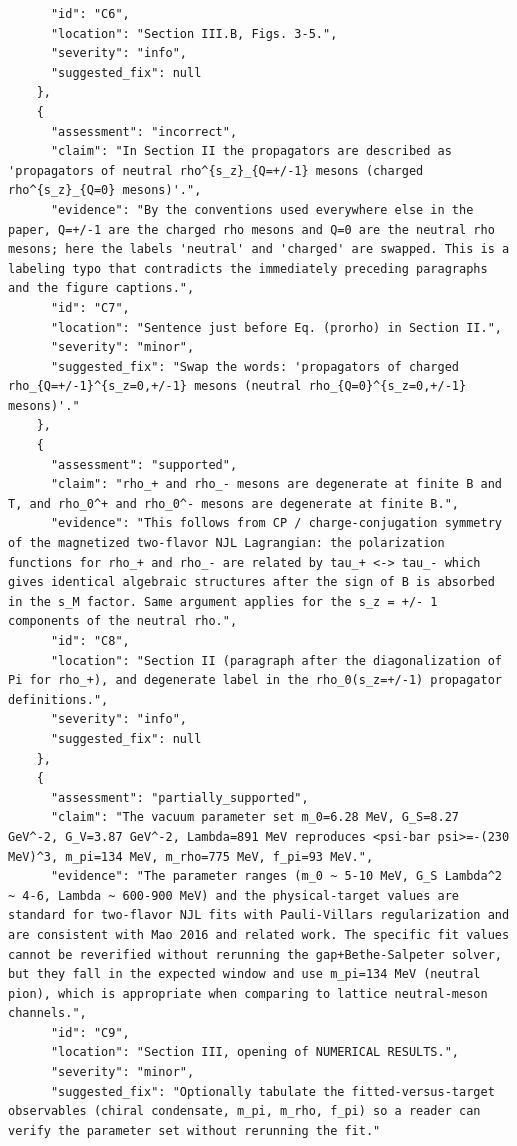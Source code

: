 \documentclass[11pt]{article}
\begin{document}
\begin{verbatim}
      "id": "C6",
      "location": "Section III.B, Figs. 3-5.",
      "severity": "info",
      "suggested_fix": null
    },
    {
      "assessment": "incorrect",
      "claim": "In Section II the propagators are described as 'propagators of neutral rho^{s_z}_{Q=+/-1} mesons (charged rho^{s_z}_{Q=0} mesons)'.",
      "evidence": "By the conventions used everywhere else in the paper, Q=+/-1 are the charged rho mesons and Q=0 are the neutral rho mesons; here the labels 'neutral' and 'charged' are swapped. This is a labeling typo that contradicts the immediately preceding paragraphs and the figure captions.",
      "id": "C7",
      "location": "Sentence just before Eq. (prorho) in Section II.",
      "severity": "minor",
      "suggested_fix": "Swap the words: 'propagators of charged rho_{Q=+/-1}^{s_z=0,+/-1} mesons (neutral rho_{Q=0}^{s_z=0,+/-1} mesons)'."
    },
    {
      "assessment": "supported",
      "claim": "rho_+ and rho_- mesons are degenerate at finite B and T, and rho_0^+ and rho_0^- mesons are degenerate at finite B.",
      "evidence": "This follows from CP / charge-conjugation symmetry of the magnetized two-flavor NJL Lagrangian: the polarization functions for rho_+ and rho_- are related by tau_+ <-> tau_- which gives identical algebraic structures after the sign of B is absorbed in the s_M factor. Same argument applies for the s_z = +/- 1 components of the neutral rho.",
      "id": "C8",
      "location": "Section II (paragraph after the diagonalization of Pi for rho_+), and degenerate label in the rho_0(s_z=+/-1) propagator definitions.",
      "severity": "info",
      "suggested_fix": null
    },
    {
      "assessment": "partially_supported",
      "claim": "The vacuum parameter set m_0=6.28 MeV, G_S=8.27 GeV^-2, G_V=3.87 GeV^-2, Lambda=891 MeV reproduces <psi-bar psi>=-(230 MeV)^3, m_pi=134 MeV, m_rho=775 MeV, f_pi=93 MeV.",
      "evidence": "The parameter ranges (m_0 ~ 5-10 MeV, G_S Lambda^2 ~ 4-6, Lambda ~ 600-900 MeV) and the physical-target values are standard for two-flavor NJL fits with Pauli-Villars regularization and are consistent with Mao 2016 and related work. The specific fit values cannot be reverified without rerunning the gap+Bethe-Salpeter solver, but they fall in the expected window and use m_pi=134 MeV (neutral pion), which is appropriate when comparing to lattice neutral-meson channels.",
      "id": "C9",
      "location": "Section III, opening of NUMERICAL RESULTS.",
      "severity": "minor",
      "suggested_fix": "Optionally tabulate the fitted-versus-target observables (chiral condensate, m_pi, m_rho, f_pi) so a reader can verify the parameter set without rerunning the fit."

\end{verbatim}
\end{document}
